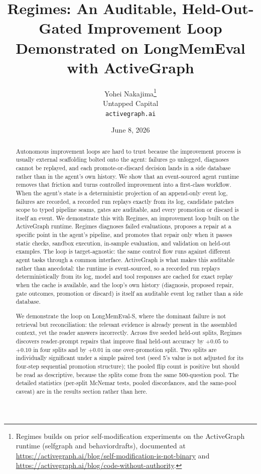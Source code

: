 \documentclass[11pt]{article}
\title{Regimes: An Auditable, Held-Out-Gated Improvement Loop\\[2pt] Demonstrated on LongMemEval with ActiveGraph}
\author{
  Yohei Nakajima\thanks{Regimes builds on prior self-modification experiments on the ActiveGraph runtime (selfgraph and behaviordrafts), documented at \url{https://activegraph.ai/blog/self-modification-is-not-binary} and \url{https://activegraph.ai/blog/code-without-authority}.}\\
  Untapped Capital\\
  \texttt{activegraph.ai}
}
\date{June 8, 2026}
\begin{document}
\maketitle

\begin{abstract}
Autonomous improvement loops are hard to trust because the improvement process is usually external scaffolding bolted onto the agent: failures go unlogged, diagnoses cannot be replayed, and each promote-or-discard decision lands in a side database rather than in the agent's own history. We show that an event-sourced agent runtime removes that friction and turns controlled improvement into a first-class workflow. When the agent's state is a deterministic projection of an append-only event log, failures are recorded, a recorded run replays exactly from its log, candidate patches scope to typed pipeline seams, gates are auditable, and every promotion or discard is itself an event. We demonstrate this with Regimes, an improvement loop built on the ActiveGraph runtime. Regimes diagnoses failed evaluations, proposes a repair at a specific point in the agent's pipeline, and promotes that repair only when it passes static checks, sandbox execution, in-sample evaluation, and validation on held-out examples. The loop is target-agnostic: the same control flow runs against different agent tasks through a common interface. ActiveGraph is what makes this auditable rather than anecdotal: the runtime is event-sourced, so a recorded run replays deterministically from its log, model and tool responses are cached for exact replay when the cache is available, and the loop's own history (diagnosis, proposed repair, gate outcomes, promotion or discard) is itself an auditable event log rather than a side database.

We demonstrate the loop on LongMemEval-S, where the dominant failure is not retrieval but reconciliation: the relevant evidence is already present in the assembled context, yet the reader answers incorrectly. Across five seeded held-out splits, Regimes discovers reader-prompt repairs that improve final held-out accuracy by $+0.05$ to $+0.10$ in four splits and by $+0.01$ in one over-promotion split. Two splits are individually significant under a simple paired test (seed 5's value is not adjusted for its four-step sequential promotion structure); the pooled flip count is positive but should be read as descriptive, because the splits come from the same 500-question pool. The detailed statistics (per-split McNemar tests, pooled discordances, and the same-pool caveat) are in the results section rather than here.


\end{abstract}
\end{document}
